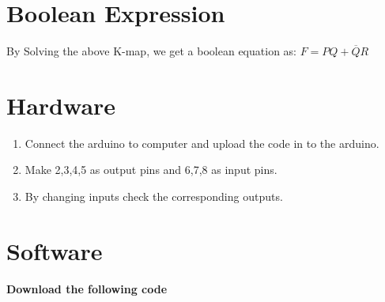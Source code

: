 \documentclass[journal,10pt, a4paper,twocolumn]{article}
\begin{document}
\section{Boolean Expression}
By Solving the above K-map, we get a boolean equation as: $F=PQ+\overline{Q}R$

\section{Hardware}
\begin{enumerate}
\item Connect the arduino to computer and upload the code in to the arduino.
\item Make 2,3,4,5 as output pins and 6,7,8 as input pins.
\item By changing inputs check the corresponding outputs.
\end{enumerate}

\section{Software}
\textbf{Download the following code}\\
\begin{center}
\end{center}
\end{document}
